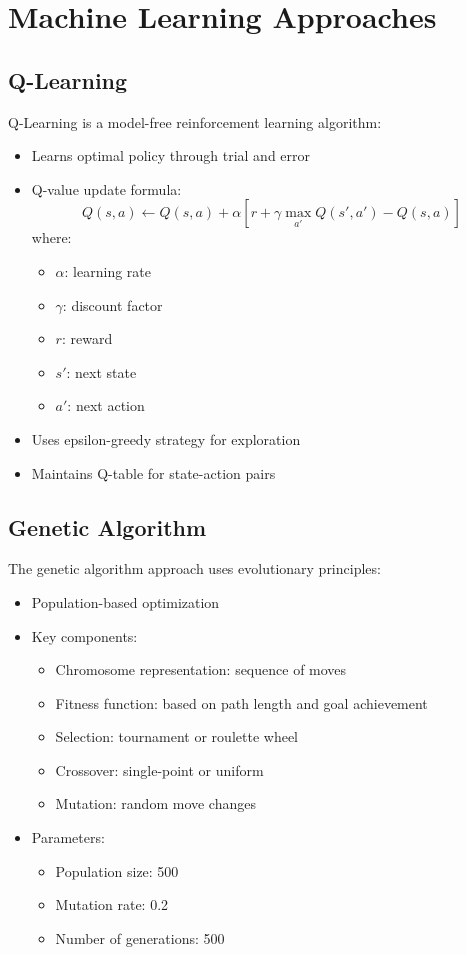 \documentclass[12pt,a4paper]{article}
\begin{document}
\section{Machine Learning Approaches}

\subsection{Q-Learning}
Q-Learning is a model-free reinforcement learning algorithm:

\begin{itemize}
    \item Learns optimal policy through trial and error
    \item Q-value update formula:
    \[Q(s,a) \leftarrow Q(s,a) + \alpha[r + \gamma \max_{a'}Q(s',a') - Q(s,a)]\]
    where:
    \begin{itemize}
        \item $\alpha$: learning rate
        \item $\gamma$: discount factor
        \item $r$: reward
        \item $s'$: next state
        \item $a'$: next action
    \end{itemize}
    \item Uses epsilon-greedy strategy for exploration
    \item Maintains Q-table for state-action pairs
\end{itemize}

\subsection{Genetic Algorithm}
The genetic algorithm approach uses evolutionary principles:

\begin{itemize}
    \item Population-based optimization
    \item Key components:
    \begin{itemize}
        \item Chromosome representation: sequence of moves
        \item Fitness function: based on path length and goal achievement
        \item Selection: tournament or roulette wheel
        \item Crossover: single-point or uniform
        \item Mutation: random move changes
    \end{itemize}
    \item Parameters:
    \begin{itemize}
        \item Population size: 500
        \item Mutation rate: 0.2
        \item Number of generations: 500
    \end{itemize}
\end{itemize}
\end{document}
